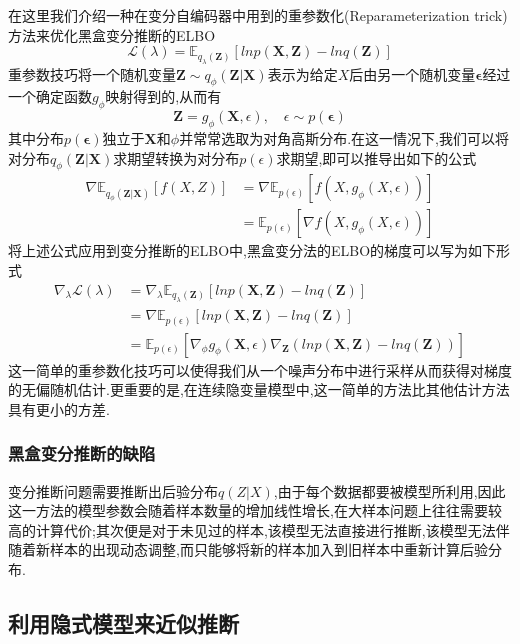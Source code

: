 \documentclass{ctexart}
\begin{document}
在这里我们介绍一种在变分自编码器中用到的重参数化(Reparameterization trick)方法来优化黑盒变分推断的ELBO
\begin{equation*}
\mathcal{L}(\lambda) = \mathbb{E}_{q_{\lambda}(\mathbf{Z})}\left[lnp(\mathbf{X,Z})-lnq(\mathbf{Z})\right]
\end{equation*}
重参数技巧将一个随机变量$\mathbf{Z}\sim q_\phi(\mathbf{Z|X})$表示为给定$X$后由另一个随机变量$\boldsymbol{\epsilon}$经过一个确定函数$g_\phi$映射得到的,从而有
\begin{equation*}
\mathbf{Z} = g_\phi(\mathbf{X},\epsilon),\quad \epsilon\sim p(\boldsymbol{\epsilon})
\end{equation*}
其中分布$p(\boldsymbol{\epsilon})$独立于$\mathbf{X}$和$\phi$并常常选取为对角高斯分布.在这一情况下,我们可以将对分布$q_\phi(\mathbf{Z|X})$求期望转换为对分布$p(\epsilon)$求期望,即可以推导出如下的公式
\begin{align*}
	\nabla\mathbb{E}_{q_\phi(\mathbf{Z|X})}[f(X,Z)] &= \nabla\mathbb{E}_{p(\epsilon)}[f(X,g_\phi(X,\epsilon))]\\
	&=\mathbb{E}_{p(\epsilon)}[\nabla f(X,g_\phi(X,\epsilon))]
\end{align*}
将上述公式应用到变分推断的ELBO中,黑盒变分法的ELBO的梯度可以写为如下形式
\begin{align*}
\nabla_{\lambda}\mathcal{L}(\lambda) &= \nabla_\lambda\mathbb{E}_{q_{\lambda}(\mathbf{Z})}\left[lnp(\mathbf{X,Z})-lnq(\mathbf{Z})\right]\\
&= \nabla\mathbb{E}_{p(\epsilon)}[lnp(\mathbf{X,Z})-lnq(\mathbf{Z})]\\
&= \mathbb{E}_{p(\epsilon)}[\nabla_\phi g_\phi(\mathbf{X},\epsilon)\nabla_\mathbf{Z}(lnp(\mathbf{X,Z})-lnq(\mathbf{Z}))]
\end{align*}
这一简单的重参数化技巧可以使得我们从一个噪声分布中进行采样从而获得对梯度的无偏随机估计.更重要的是,在连续隐变量模型中,这一简单的方法比其他估计方法具有更小的方差.\cite{louis2017areview}
\subsubsection{黑盒变分推断的缺陷}
变分推断问题需要推断出后验分布$q(Z|X)$,由于每个数据都要被模型所利用,因此这一方法的模型参数会随着样本数量的增加线性增长,在大样本问题上往往需要较高的计算代价;其次便是对于未见过的样本,该模型无法直接进行推断,该模型无法伴随着新样本的出现动态调整,而只能够将新的样本加入到旧样本中重新计算后验分布.
\subsection{利用隐式模型来近似推断}
\end{document}
